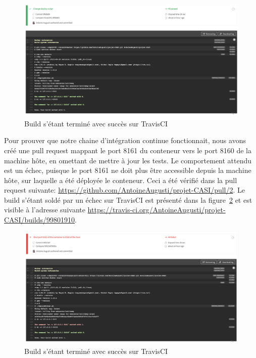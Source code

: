     \begin{figure}[H]
        \centering
        \includegraphics[width=\textwidth]{images/travis-build-success.png}
        \caption{Build s'étant terminé avec succès sur TravisCI}
        \label{fig:travis-build-success}
    \end{figure}

    Pour prouver que notre chaine d'intégration continue fonctionnait, nous avons créé une pull request mappant le port 8161 du conteneur vers le port 8160 de la machine hôte, en omettant de mettre à jour les tests. Le comportement attendu est un échec, puisque le port 8161 ne doit plus être accessible depuis la machine hôte, sur laquelle a été déployée le conteneur. Ceci a été vérifié dans la pull request suivante: \url{https://github.com/AntoineAugusti/projet-CASI/pull/2}. Le build s'étant soldé par un échec sur TravisCI est présenté dans la figure~\ref{fig:travis-build-failure} et est visible à l'adresse suivante \url{https://travis-ci.org/AntoineAugusti/projet-CASI/builds/99801910}.

    \begin{figure}[H]
        \centering
        \includegraphics[width=\textwidth]{images/travis-build-failure.png}
        \caption{Build s'étant terminé avec succès sur TravisCI}
        \label{fig:travis-build-failure}
    \end{figure}

